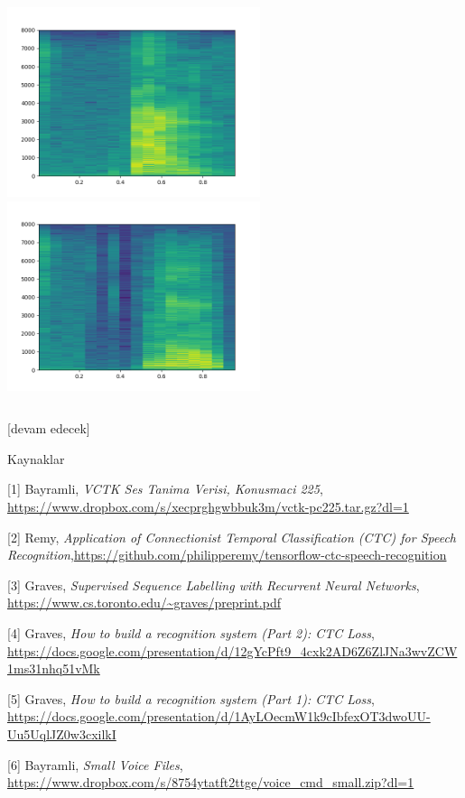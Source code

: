 \documentclass[12pt,fleqn]{article}\usepackage{../../common}
\begin{document}
\includegraphics[width=20em]{speech_03.png}
\includegraphics[width=20em]{speech_04.png}


\inputminted[fontsize=\footnotesize]{python}{train_rnn.py}


[devam edecek]



Kaynaklar

[1] Bayramli, {\em VCTK Ses Tanima Verisi, Konusmaci 225}, \url{https://www.dropbox.com/s/xecprghgwbbuk3m/vctk-pc225.tar.gz?dl=1}

[2] Remy, {\em Application of Connectionist Temporal Classification (CTC) for Speech Recognition},\url{https://github.com/philipperemy/tensorflow-ctc-speech-recognition}

[3] Graves, {\em Supervised Sequence Labelling with Recurrent Neural Networks}, \url{https://www.cs.toronto.edu/~graves/preprint.pdf}

[4] Graves, {\em How to build a recognition system (Part 2): CTC Loss}, \url{https://docs.google.com/presentation/d/12gYcPft9_4cxk2AD6Z6ZlJNa3wvZCW1ms31nhq51vMk}

[5] Graves, {\em How to build a recognition system (Part 1): CTC Loss}, \url{https://docs.google.com/presentation/d/1AyLOecmW1k9cIbfexOT3dwoUU-Uu5UqlJZ0w3cxilkI}

[6] Bayramli, {\em Small Voice Files}, \url{https://www.dropbox.com/s/8754ytatft2ttge/voice_cmd_small.zip?dl=1}
\end{document}
